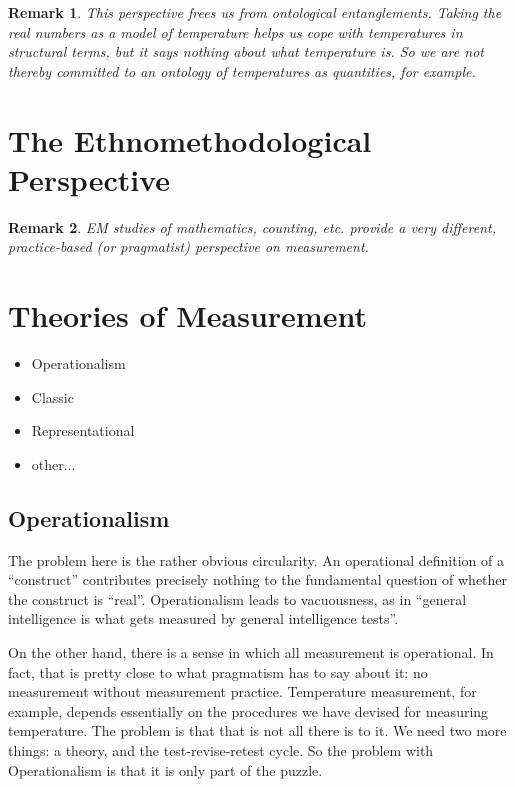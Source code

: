 \documentclass[11pt,twoside]{article}
\newtheorem{remark}{Remark}
\begin{document}
\begin{remark}
  This perspective frees us from ontological entanglements.  Taking
  the real numbers as a \textit{model} of temperature helps us cope
  with temperatures in structural terms, but it says nothing about
  what temperature \textit{is}.  So we are not thereby committed to an
  ontology of temperatures as quantities, for example.
\end{remark}

\section{The Ethnomethodological Perspective}

\begin{remark}
  EM studies of mathematics, counting, etc. provide a very different,
  practice-based (or pragmatist) perspective on measurement.
\end{remark}

\clearpage
\section{Theories of Measurement}

\begin{itemize}
\item Operationalism
\item Classic
\item Representational
\item other...
\end{itemize}

\subsection{Operationalism}

The problem here is the rather obvious circularity.  An operational
definition of a ``construct'' contributes precisely nothing to the
fundamental question of whether the construct is ``real''.
Operationalism leads to vacuousness, as in ``general intelligence is
what gets measured by general intelligence tests''.

On the other hand, there is a sense in which all measurement is
operational.  In fact, that is pretty close to what pragmatism has to
say about it: no measurement without measurement practice.
Temperature measurement, for example, depends essentially on the
procedures we have devised for measuring temperature.  The problem is
that that is not all there is to it.  We need two more things: a
theory, and the test-revise-retest cycle.  So the problem with
Operationalism is that it is only part of the puzzle.
\end{document}
